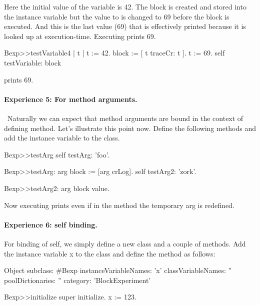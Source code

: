 \documentclass[a4paper,10pt,twoside]{book}
\begin{document}
Here the initial value of the variable  is 42. The block is created and stored into the instance variable  but the value to  is changed to 69 before the block is executed. And this is the last value (69) that is effectively printed because it is looked up at execution-time. Executing  prints 69.



\begin{code}{}
Bexp>>testVariable4
	| t |
	t := 42.
	block := [ t traceCr: t ].
	t := 69.
	self testVariable: block
\end{code}

 prints 69.





\paragraph{Experience 5: For method arguments.}\
Naturally we can expect that method arguments are bound in the context of defining method. Let's illustrate this point now. Define the following methods and add the instance variable  to the class.

\begin{code}{}
Bexp>>testArg
	self testArg: 'foo'.

Bexp>>testArg: arg
	block := [arg crLog].
	self testArg2: 'zork'.

Bexp>>testArg2: arg
	block value.
\end{code}

Now executing  prints  even if in the method  the temporary arg is redefined.

\paragraph{Experience 6: self binding.}
For binding of self, we simply define a new class and a couple of methods.
Add the instance variable x to the class \ct{Bexp} and define the  method as follows:

\begin{code}{}
Object subclass: #Bexp
	instanceVariableNames: 'x'
	classVariableNames: ''
	poolDictionaries: ''
	category: 'BlockExperiment'

Bexp>>initialize
    super initialize.
	x := 123.
\end{code}
\end{document}
